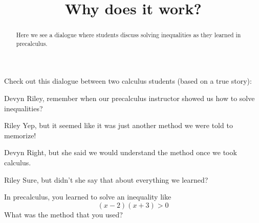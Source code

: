 \documentclass{ximera}
\title[Break-Ground:]{Why does it work?}
\begin{document}
\begin{abstract}
Here we see a dialogue where students discuss solving inequalities 
as they learned in precalculus.
\end{abstract}
\maketitle


Check out this dialogue between two calculus students (based on a true
story):

\begin{dialogue}
\item[Devyn] Riley, remember when our precalculus instructor showed us how to solve inequalities?
\item[Riley] Yep, but it seemed like it was just another method we were told to memorize!
\item[Devyn] Right, but she said we would understand the method once we took calculus.
\item[Riley] Sure, but didn't she say that about everything we learned?
\end{dialogue}

In precalculus, you learned to solve an inequality like 
$$(x-2)(x+3) > 0$$
What was the method that you used?





%
\end{document}
